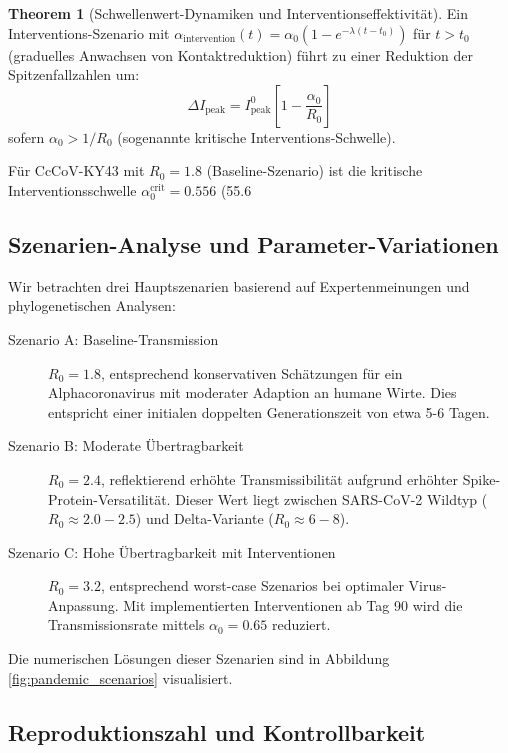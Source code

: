 ﻿\documentclass[11pt,a4paper]{article}
\theoremstyle{definition}
\newtheorem{theorem}{Theorem}[section]
\begin{document}
\begin{theorem}[Schwellenwert-Dynamiken und Interventionseffektivität]
\label{thm:intervention_threshold}
Ein Interventions-Szenario mit $\alpha_{\text{intervention}}(t) = \alpha_0 (1 - e^{-\lambda(t - t_0)})$ für $t > t_0$ (graduelles Anwachsen von Kontaktreduktion) führt zu einer Reduktion der Spitzenfallzahlen um:
\[
\Delta I_{\text{peak}} = I_{\text{peak}}^{0} \left[1 - \frac{\alpha_0}{R_0}\right]
\]
sofern $\alpha_0 > 1/R_0$ (sogenannte kritische Interventions-Schwelle).

Für CcCoV-KY43 mit $R_0 = 1.8$ (Baseline-Szenario) ist die kritische Interventionsschwelle $\alpha_0^{\text{crit}} = 0.556$ (55.6%
\end{theorem}

\subsection{Szenarien-Analyse und Parameter-Variationen}

Wir betrachten drei Hauptszenarien basierend auf Expertenmeinungen und phylogenetischen Analysen:

\begin{description}
\item[Szenario A: Baseline-Transmission] $R_0 = 1.8$, entsprechend konservativen Schätzungen für ein Alphacoronavirus mit moderater Adaption an humane Wirte. Dies entspricht einer initialen doppelten Generationszeit von etwa 5-6 Tagen.

\item[Szenario B: Moderate Übertragbarkeit] $R_0 = 2.4$, reflektierend erhöhte Transmissibilität aufgrund erhöhter Spike-Protein-Versatilität. Dieser Wert liegt zwischen SARS-CoV-2 Wildtyp ($R_0 \approx 2.0-2.5$) und Delta-Variante ($R_0 \approx 6-8$).

\item[Szenario C: Hohe Übertragbarkeit mit Interventionen] $R_0 = 3.2$, entsprechend worst-case Szenarios bei optimaler Virus-Anpassung. Mit implementierten Interventionen ab Tag 90 wird die Transmissionsrate mittels $\alpha_0 = 0.65$ reduziert.
\end{description}

Die numerischen Lösungen dieser Szenarien sind in Abbildung \ref{fig:pandemic_scenarios} visualisiert.

\subsection{Reproduktionszahl und Kontrollbarkeit}
\end{document}
